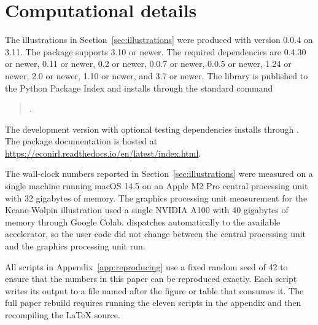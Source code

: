 \section{Computational details} \label{sec:computational}

The illustrations in Section~\ref{sec:illustrations} were produced with  version 0.0.4 on  3.11. The package supports  3.10 or newer. The required dependencies are  0.4.30 or newer,  0.11 or newer,  0.2 or newer,  0.0.7 or newer,  0.0.5 or newer,  1.24 or newer,  2.0 or newer,  1.10 or newer, and  3.7 or newer. The library is published to the Python Package Index and installs through the standard command
\begin{quote}
.
\end{quote}
The development version with optional testing dependencies installs through . The package documentation is hosted at \url{https://econirl.readthedocs.io/en/latest/index.html}.

The wall-clock numbers reported in Section~\ref{sec:illustrations} were measured on a single machine running macOS 14.5 on an Apple M2 Pro central processing unit with 32 gigabytes of memory. The graphics processing unit measurement for the Keane-Wolpin illustration used a single NVIDIA A100 with 40 gigabytes of memory through Google Colab.  dispatches automatically to the available accelerator, so the user code did not change between the central processing unit and the graphics processing unit run.

All scripts in Appendix~\ref{app:reproducing} use a fixed random seed of 42 to ensure that the numbers in this paper can be reproduced exactly. Each script writes its output to a file named after the figure or table that consumes it. The full paper rebuild requires running the eleven scripts in the appendix and then recompiling the LaTeX source.

